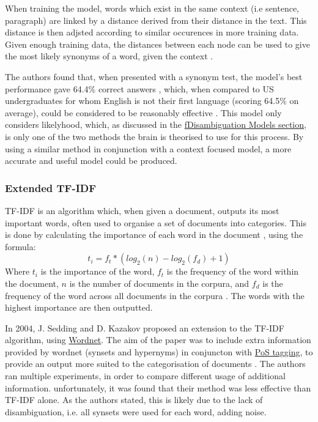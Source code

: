 \documentclass[]{article}
\begin{document}
When training the model, words which exist in the same context (i.e sentence, paragraph) are linked by a distance derived from their distance in the text. This distance is then adjsted according to similar occurences in more training data. Given enough training data, the distances between each node can be used to give the most likely synonyms of a word, given the context \cite{LatentSemanticAnalysis}.

The authors found that, when presented with a synonym test, the model's best performance gave 64.4\% correct answers , which, when compared to US undergraduates for whom English is not their first language (scoring 64.5\% on average), could be considered to be reasonably effective \cite{LatentSemanticAnalysis}. This model only considers likelyhood, which, as discussed in the \hyperref[sec:DisambiguationModels]{fDisambiguation Models section}, is only one of the two methods the brain is theorised to use for this process. By using a similar method in conjunction with a context focused model, a more accurate and useful model could be produced.

\subsubsection{Extended TF-IDF}
\label{sec:TFIDF}

TF-IDF is an algorithm which, when given a document, outputs its most important words, often used to organise a set of documents into categories. This is done by calculating the importance of each word in the document \cite{TFIDF}, using the formula:
\[t_i = f_t * (log_2(n)-log_2(f_d)+1)\]
Where \(t_i\) is the importance of the word, \(f_t\) is the frequency of the word within the document, \(n\) is the number of documents in the corpura, and \(f_d\) is the frequency of the word across all documents in the corpura \cite{SeddingKazakov}. The  words with the highest importance are then outputted.

In 2004, J. Sedding and D. Kazakov proposed an extension to the TF-IDF algorithm, using \hyperref[Wordnet]{Wordnet}. The aim of the paper was to include extra information provided by wordnet (synsets and hypernyms) in conjuncton with \hyperref[PoSTag]{PoS tagging}, to provide an output more suited to the categorisation of documents \cite{SeddingKazakov}. The authors ran multiple experiments, in order to compare different usage of additional information. unfortunately, it was found that their method was less effective than TF-IDF alone. As the authors stated, this is likely due to the lack of disambiguation, i.e. all synsets were used for each word, adding noise.
\end{document}
